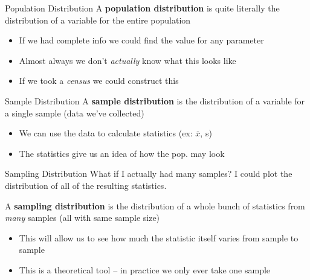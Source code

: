 \documentclass{beamer}
\begin{document}
\begin{frame}{Population Distribution}
A \textbf{population distribution} is quite literally the distribution of a variable for the entire population
\begin{itemize}
    \item If we had complete info we could find the value for any parameter
    \item Almost always we don't \textit{actually} know what this looks like
    \item If we took a \textit{census} we could construct this
\end{itemize}
\end{frame}

\begin{frame}{Sample Distribution}
A \textbf{sample distribution} is the distribution of a variable for a single sample (data we've collected)
\begin{itemize}
    \item We can use the data to calculate statistics (ex: $\overline{x}$, s)
    \item The statistics give us an idea of how the pop. may look
\end{itemize}

\end{frame}

\begin{frame}{Sampling Distribution}
What if I actually had many samples? I could plot the distribution of all of the resulting statistics. \vspace{6mm}

A \textbf{sampling distribution} is the distribution of a whole bunch of statistics from \textit{many} samples (all with same sample size)
\begin{itemize}
    \item This will allow us to see how much the statistic itself varies from sample to sample
    \item This is a theoretical tool -- in practice we only ever take one sample
\end{itemize}
\end{frame}
\end{document}
